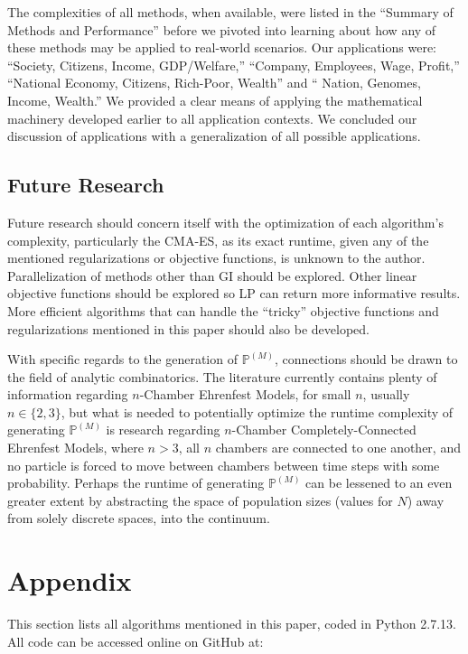 \documentclass{article}
\begin{document}
The complexities of all methods, when available, were listed in the ``Summary of Methods and Performance'' before we pivoted into learning about how any of these methods may be applied to real-world scenarios. Our applications were: ``Society, Citizens, Income, GDP/Welfare,'' ``Company, Employees, Wage, Profit,'' ``National Economy, Citizens, Rich-Poor, Wealth'' and `` Nation, Genomes, Income, Wealth.'' We provided a clear means of applying the mathematical machinery developed earlier to all application contexts. We concluded our discussion of applications with a generalization of all possible applications.

\subsection{Future Research}
Future research should concern itself with the optimization of each algorithm's complexity, particularly the CMA-ES, as its exact runtime, given any of the mentioned regularizations or objective functions, is unknown to the author. Parallelization of methods other than GI should be explored. Other linear objective functions should be explored so LP can return more informative results. More efficient algorithms that can handle the ``tricky'' objective functions and regularizations mentioned in this paper should also be developed.

With specific regards to the generation of $\mathbb{P}^{(M)}$, connections should be drawn to the field of analytic combinatorics. The literature currently contains plenty of information regarding $n$-Chamber Ehrenfest Models, for small $n$, usually $n \in \{2,3\}$, but what is needed to potentially optimize the runtime complexity of generating $\mathbb{P}^{(M)}$ is research regarding $n$-Chamber Completely-Connected Ehrenfest Models, where $n > 3$, all $n$ chambers are connected to one another, and no particle is forced to move between chambers between time steps with some probability. Perhaps the runtime of generating $\mathbb{P}^{(M)}$ can be lessened to an even greater extent by abstracting the space of population sizes (values for $N$) away from solely discrete spaces, into the continuum.

\pagebreak
\section{Appendix}
This section lists all algorithms mentioned in this paper, coded in Python 2.7.13. All code can be accessed online on GitHub at:
\end{document}
